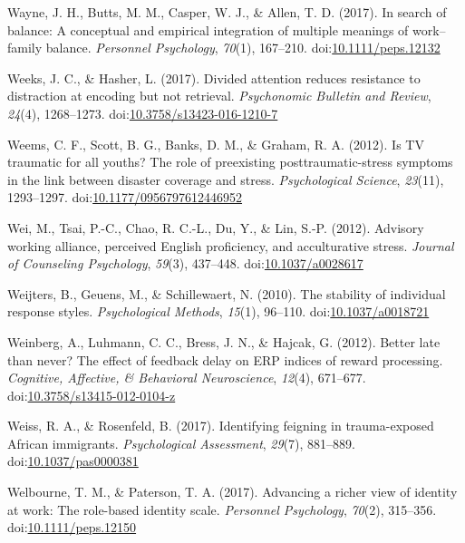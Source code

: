 \documentclass[english,man]{apa6}
\begin{document}
\hypertarget{ref-Wayne2017}{}
Wayne, J. H., Butts, M. M., Casper, W. J., \& Allen, T. D. (2017). In
search of balance: A conceptual and empirical integration of multiple
meanings of work--family balance. \emph{Personnel Psychology},
\emph{70}(1), 167--210.
doi:\href{https://doi.org/10.1111/peps.12132}{10.1111/peps.12132}

\hypertarget{ref-Weeks2016}{}
Weeks, J. C., \& Hasher, L. (2017). Divided attention reduces resistance
to distraction at encoding but not retrieval. \emph{Psychonomic Bulletin
and Review}, \emph{24}(4), 1268--1273.
doi:\href{https://doi.org/10.3758/s13423-016-1210-7}{10.3758/s13423-016-1210-7}

\hypertarget{ref-Weems2012}{}
Weems, C. F., Scott, B. G., Banks, D. M., \& Graham, R. A. (2012). Is TV
traumatic for all youths? The role of preexisting posttraumatic-stress
symptoms in the link between disaster coverage and stress.
\emph{Psychological Science}, \emph{23}(11), 1293--1297.
doi:\href{https://doi.org/10.1177/0956797612446952}{10.1177/0956797612446952}

\hypertarget{ref-Wei2012}{}
Wei, M., Tsai, P.-C., Chao, R. C.-L., Du, Y., \& Lin, S.-P. (2012).
Advisory working alliance, perceived English proficiency, and
acculturative stress. \emph{Journal of Counseling Psychology},
\emph{59}(3), 437--448.
doi:\href{https://doi.org/10.1037/a0028617}{10.1037/a0028617}

\hypertarget{ref-Weijters2010}{}
Weijters, B., Geuens, M., \& Schillewaert, N. (2010). The stability of
individual response styles. \emph{Psychological Methods}, \emph{15}(1),
96--110. doi:\href{https://doi.org/10.1037/a0018721}{10.1037/a0018721}

\hypertarget{ref-Weinberg2012}{}
Weinberg, A., Luhmann, C. C., Bress, J. N., \& Hajcak, G. (2012). Better
late than never? The effect of feedback delay on ERP indices of reward
processing. \emph{Cognitive, Affective, \& Behavioral Neuroscience},
\emph{12}(4), 671--677.
doi:\href{https://doi.org/10.3758/s13415-012-0104-z}{10.3758/s13415-012-0104-z}

\hypertarget{ref-Weiss2017}{}
Weiss, R. A., \& Rosenfeld, B. (2017). Identifying feigning in
trauma-exposed African immigrants. \emph{Psychological Assessment},
\emph{29}(7), 881--889.
doi:\href{https://doi.org/10.1037/pas0000381}{10.1037/pas0000381}

\hypertarget{ref-Welbourne2017}{}
Welbourne, T. M., \& Paterson, T. A. (2017). Advancing a richer view of
identity at work: The role-based identity scale. \emph{Personnel
Psychology}, \emph{70}(2), 315--356.
doi:\href{https://doi.org/10.1111/peps.12150}{10.1111/peps.12150}
\end{document}
